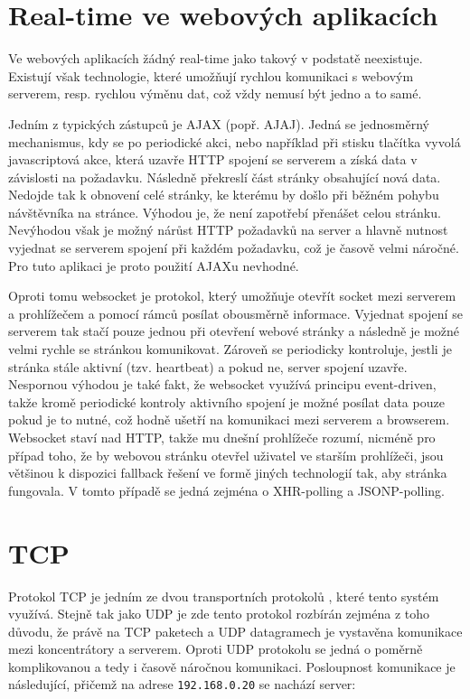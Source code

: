 \section{Real-time ve webových aplikacích}
Ve webových aplikacích žádný real-time jako takový v podstatě neexistuje. Existují však technologie, které umožňují rychlou komunikaci s webovým serverem, resp. rychlou výměnu dat, což vždy nemusí být jedno a to samé.

Jedním z typických zástupců je AJAX (popř. AJAJ). Jedná se jed\-no\-směr\-ný mechanismus, kdy se po periodické akci, nebo například při stisku tlačítka vyvolá javascriptová akce, která uzavře HTTP spojení se serverem a získá data v závislosti na požadavku. Následně překreslí část stránky obsahující nová data. Nedojde tak k obnovení celé stránky, ke kterému by došlo při běžném pohybu návštěvníka na stránce. Výhodou je, že není zapotřebí přenášet celou stránku. Nevýhodou však je možný nárůst HTTP požadavků na server a hlavně nutnost vyjednat se serverem spojení při každém po\-ža\-dav\-ku, což je časově velmi náročné. Pro tuto aplikaci je proto použití AJAXu nevhodné.

Oproti tomu websocket \cite{rfc6455} je protokol, který umožňuje otevřít socket mezi serverem a prohlížečem a pomocí rámců posílat obousměrně informace. Vyjednat spojení se serverem tak stačí pouze jednou při otevření webové stránky a následně je možné velmi rychle se stránkou komunikovat. Zároveň se periodicky kontroluje, jestli je stránka stále aktivní (tzv. heartbeat) a pokud ne, server spojení uzavře. Nespornou výhodou je také fakt, že websocket využívá principu event-driven, takže kromě periodické kontroly aktivního spojení je možné posílat data pouze pokud je to nutné, což hodně ušetří na komunikaci mezi serverem a browserem. Websocket staví nad HTTP, takže mu dnešní prohlížeče rozumí, nicméně pro případ toho, že by webovou stránku otevřel uživatel ve starším prohlížeči, jsou většinou k dispozici fallback řešení ve formě jiných technologií tak, aby stránka fungovala. V tomto případě se jedná zejména o XHR-polling a JSONP-polling.

\section{TCP}
Protokol TCP je jedním ze dvou transportních protokolů \cite{mistrovstvi}, které tento systém využívá. Stejně tak jako UDP je zde tento protokol rozbírán zejména z toho důvodu, že právě na TCP paketech a UDP datagramech je vystavěna komunikace mezi koncentrátory a serverem. Oproti UDP protokolu se jedná o poměrně komplikovanou a tedy i časově náročnou komunikaci. Posloupnost komunikace je následující, přičemž na adrese \texttt{192.168.0.20} se  nachází server:

